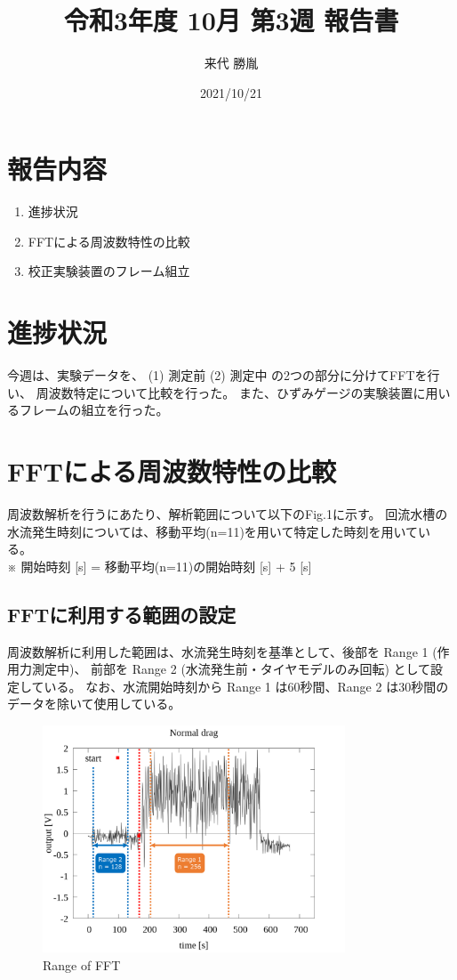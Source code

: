 \documentclass[twocolumn,a4j]{jsarticle}
\author{来代 勝胤}
\title{令和3年度 10月 第3週 報告書}
\date{2021/10/21}
\begin{document}
\columnseprule=0.1mm

\maketitle
\section*{報告内容}
\begin{enumerate}[1.]
    \item 進捗状況
    \item FFTによる周波数特性の比較
    \item 校正実験装置のフレーム組立
\end{enumerate}
\section{進捗状況}
今週は、実験データを、
(1) 測定前 (2) 測定中 の2つの部分に分けてFFTを行い、
周波数特定について比較を行った。
また、ひずみゲージの実験装置に用いるフレームの組立を行った。

\section{FFTによる周波数特性の比較}
周波数解析を行うにあたり、解析範囲について以下のFig.1に示す。
回流水槽の水流発生時刻については、移動平均(n=11)を用いて特定した時刻を用いている。\\
※ 開始時刻 [s] = 移動平均(n=11)の開始時刻 [s] + 5 [s]\\

\subsection{FFTに利用する範囲の設定}
周波数解析に利用した範囲は、水流発生時刻を基準として、後部を Range 1 (作用力測定中)、
前部を Range 2 (水流発生前・タイヤモデルのみ回転) として設定している。
なお、水流開始時刻から Range 1 は60秒間、Range 2 は30秒間のデータを除いて使用している。
\begin{figure}[htbp]
    \footnotesize
    \begin{center}
        \includegraphics[width=90mm]{../images/image_1.png}
        \caption{Range of FFT}
    \end{center}
\end{figure}
\end{document}
